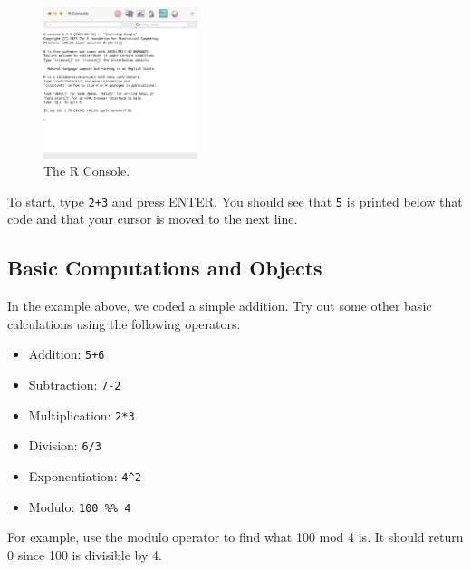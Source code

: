 \documentclass[
  letterpaper,
]{krantz}
\providecommand{\tightlist}{%
  \setlength{\itemsep}{0pt}\setlength{\parskip}{0pt}}\usepackage{longtable,booktabs,array}
\begin{document}
\begin{figure}

{\centering \includegraphics[width=0.4\textwidth,height=\textheight]{book/images/1-r-console.png}

}

\caption{\label{fig-r-console}The R Console.}

\end{figure}

To start, type \texttt{2+3} and press ENTER. You should see that
\texttt{5} is printed below that code and that your cursor is moved to
the next line.

\hypertarget{basic-computations-and-objects}{%
\subsection{Basic Computations and
Objects}\label{basic-computations-and-objects}}

In the example above, we coded a simple addition. Try out some other
basic calculations using the following operators:

\begin{itemize}
\tightlist
\item
  Addition: \texttt{5+6}\\
\item
  Subtraction: \texttt{7-2}\\
\item
  Multiplication: \texttt{2*3}\\
\item
  Division: \texttt{6/3}\\
\item
  Exponentiation: \texttt{4\^{}2}\\
\item
  Modulo: \texttt{100\ \%\%\ 4}
\end{itemize}

For example, use the modulo operator to find what 100 mod 4 is. It
should return 0 since 100 is divisible by 4.
\end{document}
